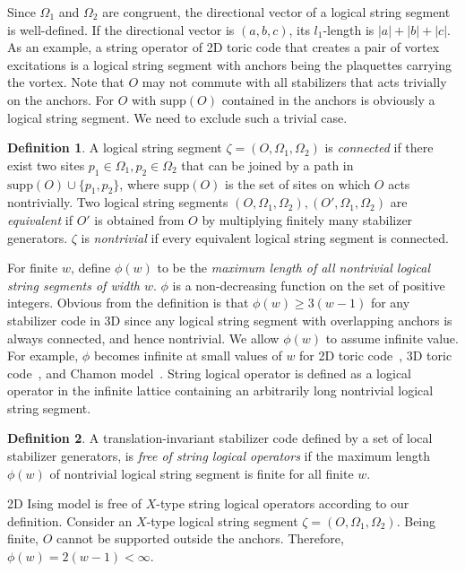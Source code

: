 \documentclass[letterpaper,10pt,pra,aps,showpacs,twocolumn]{revtex4-1}
\theoremstyle{definition} \newtheorem{defn}{Definition}
\theoremstyle{definition} \newtheorem{remark}{Remark}
\newcommand{\supp}{\mathrm{supp}}
\begin{document}
Since $\Omega_1$ and $\Omega_2$ are congruent, the directional vector of a logical string segment is well-defined. If the directional vector is $(a,b,c)$, its $l_1$-length is $|a|+|b|+|c|$. As an example, a string operator of 2D toric code that creates a pair of vortex excitations is a logical string segment with anchors being the plaquettes carrying the vortex. Note that $O$ may not commute with all stabilizers that acts trivially on the anchors. For $O$ with $\supp(O)$ contained in the anchors is obviously a logical string segment. We need to exclude such a trivial case.

\begin{defn}
A logical string segment $\zeta=(O,\Omega_1,\Omega_2)$ is \emph{connected} if there exist two sites $p_1 \in \Omega_1, p_2 \in \Omega_2$ that can be joined by a path in $\supp(O) \cup \{p_1,p_2\}$, where $\supp(O)$ is the set of sites on which $O$ acts nontrivially. Two logical string segments $(O,\Omega_1,\Omega_2), (O',\Omega_1,\Omega_2)$ are \emph{equivalent} if $O'$ is obtained from $O$ by multiplying finitely many stabilizer generators. $\zeta$ is \emph{nontrivial} if every equivalent logical string segment is connected.
\end{defn}

For finite $w$, define $ \phi(w) $ to be the \emph{maximum length of all nontrivial logical string segments of width $w$}. $\phi$ is a non-decreasing function on the set of positive integers. Obvious from the definition is that $\phi(w) \geq 3(w-1)$ for any stabilizer code in 3D since any logical string segment with overlapping anchors is always connected, and hence nontrivial. We allow $\phi(w)$ to assume infinite value. For example, $\phi$ becomes infinite at small values of $w$ for 2D toric code~\cite{Kitaev2003Fault-tolerant}, 3D toric code~\cite{CastelnovoChamon2008Topological}, and Chamon model~\cite{Chamon2005Quantum,BravyiLeemhuisTerhal2010Topological}. String logical operator is defined as a logical operator in the infinite lattice containing an arbitrarily long nontrivial logical string segment.

\begin{defn}
A translation-invariant stabilizer code defined by a set of local stabilizer generators, 
is \emph{free of string logical operators} if the maximum length $\phi(w)$ of nontrivial logical string segment is finite for all finite $w$.
\end{defn}

2D Ising model is free of $X$-type string logical operators according to our definition. Consider an $X$-type logical string segment $\zeta=(O,\Omega_1,\Omega_2)$. Being finite, $O$ cannot be supported outside the anchors. Therefore, $\phi(w) = 2(w-1) < \infty$.
 
\end{document}
